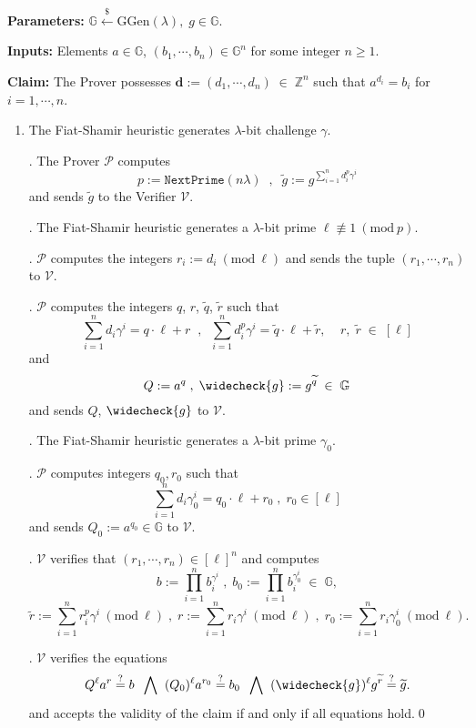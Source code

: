 \documentclass[11pt, lettersize, notitlepage, leqno, footskip=0.6cm]{article}
\newcommand{\bz}{\mathbb Z}
\newcommand{\pl}{\prod\limits}
\newcommand{\slim}{\sum\limits}
\newcommand{\ttt}{\texttt}
\newcommand{\bG}{\mathbb{G}}
\newcommand{\wti}{\widetilde}
\newcommand{\mc}{\mathcal}
\newcommand{\mb}{\mathbb}
\newcommand{\mbf}{\mathbf}
\newcommand{\mr}{\mathrm}
\newcommand{\lam}{\lambda}
\newcommand{\lamb}{\lambda}
\newcommand{\weck}{\widecheck}
\newcommand{\mP}{\mc{P}}
\newcommand{\V}{\mc{V}}
\newcommand{\vs}{\vspace{-0.15cm}}
\newcommand{\noin}{\noindent}
\newcommand{\sta}{\stackrel{?}{=}}
\newcommand{\Mod}[1]{\ (\mathrm{mod}\ #1)}
\newtheorem{Prot}[Thm]{Protocol}
\numberwithin{equation}{section}
\begin{document}
 \vspace{-0.3cm}

\noindent \textbf{Parameters:} $\mb{G}\xleftarrow{\$} \mr{GGen}(\lamb), \; g\in \mb{G}$.

\noindent \textbf{Inputs:} Elements $a\in\mb{G} $, $(b_1,\cdots,b_n)\in \mb{G}^n$ for some integer $n\geq 1$.

\noindent \textbf{Claim:} The Prover possesses $\mbf{d}:= (d_1,\cdots, d_n)\;\in\;\bz^n$ such that $a^{d_i} = b_i$ for $i = 1,\cdots, n$.

\begin{enumerate}[wide, labelwidth=!, labelindent=0pt]\vs \item \normalfont The Fiat-Shamir heuristic generates $\lamb$-bit challenge $\gamma$.

\noin 2. The Prover $\mc{P}$ computes \vspace{-0.25cm} $$p:= \ttt{NextPrime}(n\lam)\;\;,\;\;\wti{g} := g^{\sum\limits_{i=1}^n d_i^{p}\gamma^i}$$ and sends $\wti{g}$ to the Verifier $\mc{V}$.


\noin 3. The Fiat-Shamir heuristic generates a $\lam$-bit prime $\ell\not\equiv 1\Mod{p}$. 

\noin 4. $\mc{P}$ computes the integers $r_i:= d_i\Mod{\ell}$ and sends the tuple $(r_1,\cdots,r_n)$ to $\V$.

\noin 5. $\mP$ computes the integers $q$, $r$, $\wti{q}$, $\wti{r}$ such that \vs $$\slim_{i=1}^n d_i\gamma^i = q \cdot \ell+r\;\;,\;\; \slim_{i=1}^n d_i^{p}\gamma^i = \wti{q} \cdot \ell+\wti{r},\;\;\;\;r,\;\wti{r}\;\in\;[\ell]$$ and \vs $$Q:= a^q\;,\; \weck{g}:= g^{\wti{q}}\;\in\;\bG$$ and sends $Q$, $\weck{g}$ to $\V$.

\noin 6. The Fiat-Shamir heuristic generates a $\lam$-bit prime $\gamma_{0}$.

\noin 7. $\mP$ computes integers $q_0, r_0$ such that \vs $$\slim_{i=1}^n d_i\gamma_{0}^i = q_0 \cdot \ell+r_0\;,\;r_0\in[\ell] $$ and sends $Q_0:= a^{q_0}\in \bG$ to $\V.$

\noin 8. $\mc{V}$ verifies that $(r_1,\cdots,r_n)\in [\ell]^n$ and computes \vs $$b := \pl_{i=1}^n b_i^{\gamma^i}\;,\;b_0 := \pl_{i=1}^n b_i^{\gamma_{0}^i}\;\in \;\bG,$$ \vspace{-0.2cm} $$\wti{r}:= \slim_{i=1}^n r_i^{p}\gamma^i\Mod{\ell}\;,\;r:= \slim_{i=1}^n r_i\gamma^i\Mod{\ell}\;,\;r_0:=\slim_{i=1}^n r_i\gamma_{0}^i\Mod{\ell}.$$ 

\noin 9. $\V$ verifies the equations \vs $$Q^{\ell}a^r\sta b\;\;\bigwedge\;\;(Q_0)^{\ell}a^{r_0}\sta b_0\;\;\bigwedge\;\; (\weck{g})^{\ell}g^{\wti{r}}\sta\wti{g}.$$ and accepts the validity of the claim if and only if all equations hold.\qed  \end{enumerate}
\end{document}
